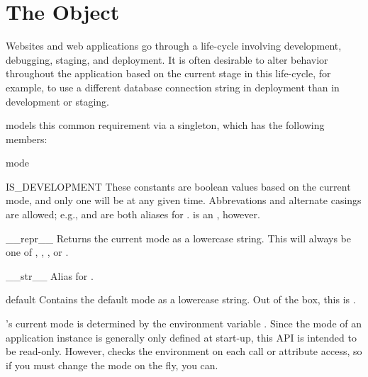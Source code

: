 \section{The  Object \label{mode}}

Websites and web applications go through a life-cycle involving development,
debugging, staging, and deployment. It is often desirable to alter behavior
throughout the application based on the current stage in this life-cycle, for
example, to use a different database connection string in deployment than in
development or staging.

 models this common requirement via a  singleton,
which has the following members:

\begin{classdesc*}{mode}
\begin{memberdesc}{IS_DEVELOPMENT}
    These constants are boolean values based on the current mode, and only one
    will be  at any given time. Abbrevations and alternate casings
    are allowed; e.g.,  and  are both
    aliases for .  is an
    , however.
\end{memberdesc}

\begin{methoddesc}{__repr__}{}
    Returns the current mode as a lowercase string. This will always be one of
    , , , or .
\end{methoddesc}

\begin{methoddesc}{__str__}{}
    Alias for .
\end{methoddesc}

\begin{memberdesc}{default}
    Contains the default mode as a lowercase string. Out of the box, this is
    .
\end{memberdesc}

\end{classdesc*}


's current mode is determined by the environment variable
. Since the mode of an application instance is generally only
defined at start-up, this API is intended to be read-only. However, 
checks the environment on each call or attribute access, so if you must change
the mode on the fly, you can.

